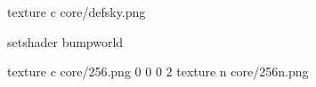 texture c core/defsky.png

setshader bumpworld

texture c core/256.png 0 0 0 2
texture n core/256n.png